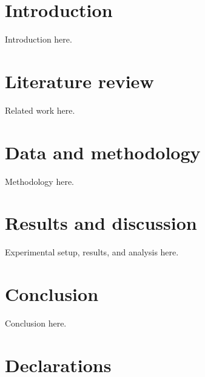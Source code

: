 \documentclass[preprint,12pt,authoryear]{elsarticle}
\begin{document}

\section{Introduction}
\label{sec:intro}
Introduction here.

\section{Literature review}
\label{sec:related_work}
Related work here.

\section{Data and methodology}
\label{sec:method}
Methodology here.

\section{Results and discussion}
\label{sec:experiments}
Experimental setup, results, and analysis here.

\section{Conclusion}
\label{sec:conclusion}
Conclusion here.

\section*{Declarations}



\end{document}
